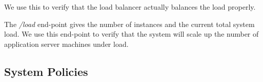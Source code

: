 			We use this to verify that the load balancer actually balances the load properly.
			
			The \textit{/load} end-point gives the number of instances and the current total system load.
			We use this end-point to verify that the system will scale up the number of application server machines under load.

\subsection{System Policies}
	
